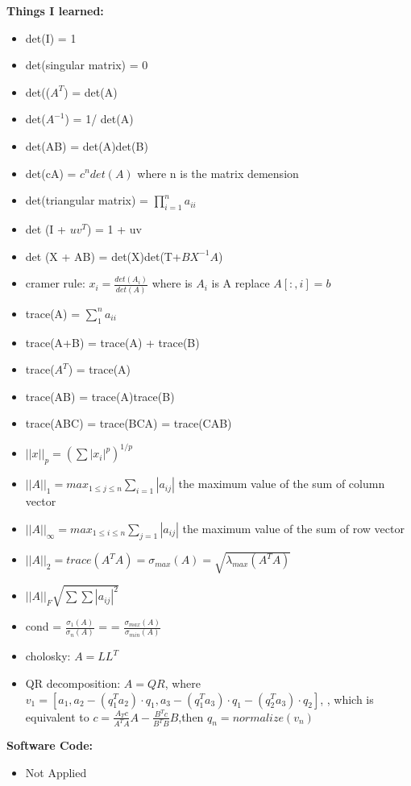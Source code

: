 \documentclass{article}
\begin{document}
\textbf{Things I learned:}
\begin{itemize}
\item det(I) = 1
\item det(singular matrix) = 0
\item det(($A^{T}$) =  det(A)
\item det($A^{-1}$) = 1/ det(A)
\item det(AB) = det(A)det(B)
\item det(cA) = $c^ndet(A)$ where n is the matrix demension
\item det(triangular matrix) =  $\prod_{i = 1}^{n} a_{ii}$
\item  det (I + $uv^T$) = 1 + uv
\item  det (X + AB) = det(X)det(T+$BX^{-1}A$)
\item cramer rule: $x_i = \frac{det(A_i)}{det(A)}$ where is $A_i$ is A replace $A[:,i] = b$
\item trace(A) = $\sum^n_1 a_{ii}$
\item trace(A+B) = trace(A) + trace(B)
\item trace($A^T$) = trace(A)
\item trace(AB) = trace(A)trace(B)
\item trace(ABC) = trace(BCA) = trace(CAB)
\item $||x||_p = (\sum |x_i|^p)^{1/p}$
\item $||A||_1 = max_{1\leq j \leq n} \sum_{i =1} |a_{ij}|$ the maximum value of the sum of column vector
\item $||A||_{\infty} = max_{1\leq i \leq n} \sum_{j =1} |a_{ij}|$ the maximum value of the sum of row vector
\item $||A||_{2} = trace(A^TA) = \sigma_{max}(A) = \sqrt{\lambda_{max}(A^TA)}$ 
\item $||A||_{F} \sqrt{\sum \sum |a_{ij}|^2} $
\item cond = $\frac{\sigma_1(A)}{\sigma_n(A)}$ = = $\frac{\sigma_{max}(A)}{\sigma_{min}(A)}$
\item cholosky: $A = LL^T$
\item QR decomposition: $A = QR$, where $v_1 = [a_1,a_2-(q_1^Ta_2)\cdot q_1,a_3-(q_1^Ta_3)\cdot q_1 -(q_2^Ta_3)\cdot q_2]$, , which is equivalent to $c = \frac{A_T c}{A^TA}A - \frac{B^Tc}{B^TB}B $,then $q_n = normalize(v_n)$
\end{itemize}
\textbf{Software Code:}
\begin{itemize}
\item  Not Applied
\end{itemize}
\end{document}

